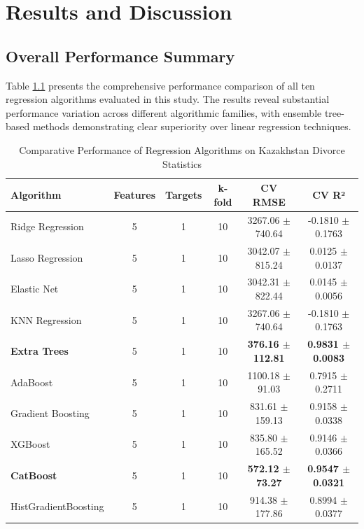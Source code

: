 %
%
\chapter{Results and Discussion}
\label{chap:results}
\setlength{\parskip}{1em}

\section{Overall Performance Summary}

Table \ref{tab:results} presents the comprehensive performance comparison of all ten regression algorithms evaluated in this study. The results reveal substantial performance variation across different algorithmic families, with ensemble tree-based methods demonstrating clear superiority over linear regression techniques.

\begin{table}[H]
\centering
\caption{Comparative Performance of Regression Algorithms on Kazakhstan Divorce Statistics}
\label{tab:results}
\begin{tabular}{|l|c|c|c|c|c|}
\hline
\textbf{Algorithm} & \textbf{Features} & \textbf{Targets} & \textbf{k-fold} & \textbf{CV RMSE} & \textbf{CV R²} \\
\hline
Ridge Regression & 5 & 1 & 10 & 3267.06 $\pm$ 740.64 & -0.1810 $\pm$ 0.1763 \\
Lasso Regression & 5 & 1 & 10 & 3042.07 $\pm$ 815.24 & 0.0125 $\pm$ 0.0137 \\
Elastic Net & 5 & 1 & 10 & 3042.31 $\pm$ 822.44 & 0.0145 $\pm$ 0.0056 \\
KNN Regression & 5 & 1 & 10 & 3267.06 $\pm$ 740.64 & -0.1810 $\pm$ 0.1763 \\
\textbf{Extra Trees} & 5 & 1 & 10 & \textbf{376.16 $\pm$ 112.81} & \textbf{0.9831 $\pm$ 0.0083} \\
AdaBoost & 5 & 1 & 10 & 1100.18 $\pm$ 91.03 & 0.7915 $\pm$ 0.2711 \\
Gradient Boosting & 5 & 1 & 10 & 831.61 $\pm$ 159.13 & 0.9158 $\pm$ 0.0338 \\
XGBoost & 5 & 1 & 10 & 835.80 $\pm$ 165.52 & 0.9146 $\pm$ 0.0366 \\
\textbf{CatBoost} & 5 & 1 & 10 & \textbf{572.12 $\pm$ 73.27} & \textbf{0.9547 $\pm$ 0.0321} \\
HistGradientBoosting & 5 & 1 & 10 & 914.38 $\pm$ 177.86 & 0.8994 $\pm$ 0.0377 \\
\hline
\end{tabular}
\end{table}

